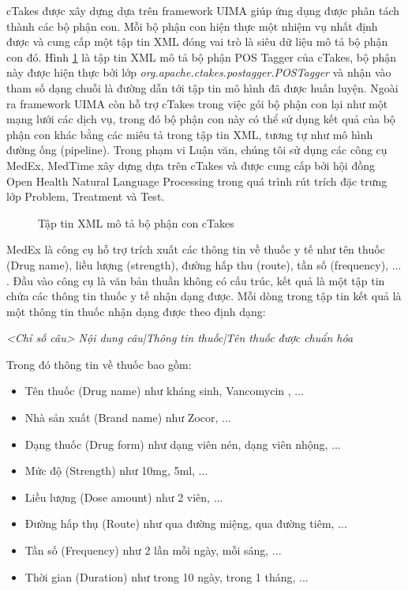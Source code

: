 cTakes được xây dựng dựa trên framework UIMA giúp ứng dụng được phân tách thành các bộ phận con. Mỗi bộ phận con hiện thực một nhiệm vụ nhất định được và cung cấp một tập tin XML đóng vai trò là siêu dữ liệu mô tả bộ phận con đó. Hình \ref{ctakesdesc} là tập tin XML mô tả bộ phận POS Tagger của cTakes, bộ phận này được hiện thực bởi lớp \textit{org.apache.ctakes.postagger.POSTagger} và nhận vào tham số dạng chuỗi là đường dẫn tới tập tin mô hình đã được huấn luyện. Ngoài ra framework UIMA còn hỗ trợ cTakes trong việc gói bộ phận con lại như một mạng lưới các dịch vụ, trong đó bộ phận con này có thể sử dụng kết quả của bộ phận con khác bằng các miêu tả trong tập tin XML, tương tự như mô hình đường ống (pipeline). Trong phạm vi Luận văn, chúng tôi sử dụng các công cụ MedEx, MedTime xây dựng dựa trên cTakes và được cung cấp bởi hội đồng Open Health Natural Language Processing trong quá trình rút trích đặc trưng lớp Problem, Treatment và Test.

\begin{figure}[ht]
\centering
{}

\caption{Tập tin XML mô tả bộ phận con cTakes\label{ctakesdesc}}
\end{figure}

MedEx là công cụ hỗ trợ trích xuất các thông tin về thuốc y tế như tên thuốc (Drug name), liều lượng (strength), đường hấp thu (route), tần số (frequency), ... \cite{HuaXu2009}. Đầu vào công cụ là văn bản thuần không có cấu trúc, kết quả là một tập tin chứa các thông tin thuốc y tế nhận dạng được. Mỗi dòng trong tập tin kết quả là một thông tin thuốc nhận dạng được theo định dạng:

\begin{center}
\textit{<Chỉ số câu>	Nội dung câu|Thông tin thuốc|Tên thuốc được chuẩn hóa}
\end{center}

\noindent Trong đó thông tin về thuốc bao gồm:

\begin{itemize}
\item Tên thuốc (Drug name) như kháng sinh, Vancomycin , ...
\item Nhà sản xuất (Brand name) như Zocor, ...
\item Dạng thuốc (Drug form) như dạng viên nén, dạng viên nhộng, ...
\item Mức độ (Strength) như 10mg, 5ml, ...
\item Liều lượng (Dose amount) như 2 viên, ...
\item Đường hấp thụ (Route) như qua đường miệng, qua đường tiêm, ...
\item Tần số (Frequency) như 2 lần mỗi ngày, mỗi sáng, ...
\item Thời gian (Duration) như trong 10 ngày, trong 1 tháng, ...
\end{itemize}

